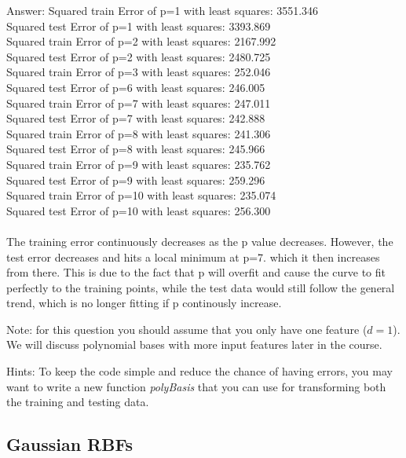 \documentclass{article}
\def\ans#1{\par\gre{Answer: #1}}
\def\gre#1{{\color{gre}#1}}
\begin{document}
\ans{Squared train Error of p=1 with least squares: 3551.346\\
Squared test Error of p=1 with least squares: 3393.869\\
Squared train Error of p=2 with least squares: 2167.992\\
Squared test Error of p=2 with least squares: 2480.725\\
Squared train Error of p=3 with least squares: 252.046\\
Squared test Error of p=6 with least squares: 246.005\\
Squared train Error of p=7 with least squares: 247.011\\
Squared test Error of p=7 with least squares: 242.888\\
Squared train Error of p=8 with least squares: 241.306\\
Squared test Error of p=8 with least squares: 245.966\\
Squared train Error of p=9 with least squares: 235.762\\
Squared test Error of p=9 with least squares: 259.296\\
Squared train Error of p=10 with least squares: 235.074\\
Squared test Error of p=10 with least squares: 256.300\\
\\
The training error continuously decreases as the p value decreases. However, the test error decreases and hits a local minimum at p=7. which it then increases from there. This is due to the fact that p will overfit and cause the curve to fit perfectly to the training points, while the test data would still follow the general trend, which is no longer fitting if p continously increase.}

Note: for this question you should assume that you only have one feature ($d=1$). We will discuss polynomial bases with more input features later in the course.

Hints: To keep the code simple and reduce the chance of having errors, you may want to write a new function \emph{polyBasis} that you can use for transforming both the training and testing data.

\pagebreak

\subsection{Gaussian RBFs}
\end{document}
